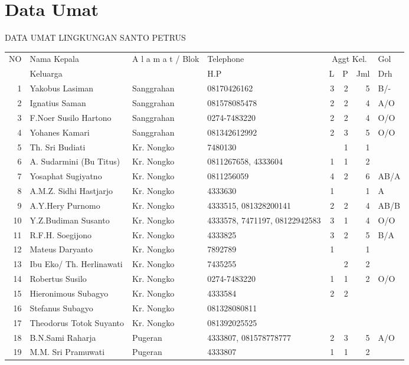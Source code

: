 \documentclass[a5paper,titlepage,11pt]{book}
\begin{document}
\section{Data Umat}
\begin{center}
DATA UMAT LINGKUNGAN SANTO PETRUS\\
\end{center}
\scriptsize
\begin{tabular}{|r|l|l|p{1.7cm}|r|r|r|p{0.7cm}|}
\hline
NO	&Nama Kepala	&A l a m a t / Blok	&Telephone	&\multicolumn{3}{|c|}{Aggt Kel.}&Gol\\ \cline{5-7}
	&Keluarga	&	&H.P	&L	&P	&Jml	&Drh\\
\hline
1	&Yakobus Lasiman	&Sanggrahan	&08170426162	&3	&2	&5	&B/-\\
2	&Ignatius Saman	&Sanggrahan	&081578085478	&2	&2	&4	&A/O\\
3	&F.Noer Susilo Hartono	&Sanggrahan	&0274-7483220	&2	&2	&4	&O/O\\
4	&Yohanes Kamari	&Sanggrahan	&081342612992	&2	&3	&5	&O/O\\
5	&Th. Sri Budiati	&Kr. Nongko	&7480130	&	&1	&1	&\\
6	&A. Sudarmini (Bu Titus)	&Kr. Nongko	&0811267658, 4333604	&1	&1	&2	&\\
7	&Yosaphat Sugiyatno	&Kr. Nongko	&0811256059	&4	&2	&6	&AB/A\\
8	&A.M.Z. Sidhi Hastjarjo	&Kr. Nongko	&4333630	&1	&	&1	&A\\
9	&A.Y.Hery Purnomo	&Kr. Nongko	&4333515, 081328200141	&2	&2	&4	&AB/B\\
10	&Y.Z.Budiman Susanto	&Kr. Nongko	&4333578, 7471197, 08122942583	&3	&1	&4	&O/O\\
11	&R.F.H. Soegijono	&Kr. Nongko	&4333825	&3	&2	&5	&B/A\\
12	&Mateus Daryanto	&Kr. Nongko	&7892789	&1	&	&1	&\\
13	&Ibu Eko/ Th. Herlinawati	&Kr. Nongko	&7435255	&	&2	&2	&\\
14	&Robertus Susilo	&Kr. Nongko	&0274-7483220&1&1&2&O/O\\
15	&Hieronimous Subagyo	&Kr. Nongko	&4333584	&2	&2	&	&\\
16 &Stefanus Subagyo &Kr. Nongko &081328080811& & & &\\
17	&Theodorus Totok Suyanto	&Kr. Nongko	&081392025525	&	&	&	&\\
18	&B.N.Sami Raharja	&Pugeran	&4333807, 081578778777	&2	&3	&5	&A/O\\
19	&M.M. Sri Pramuwati	&Pugeran	&4333807	&1	&1	&2	&\\

\end{tabular}
\end{document}
